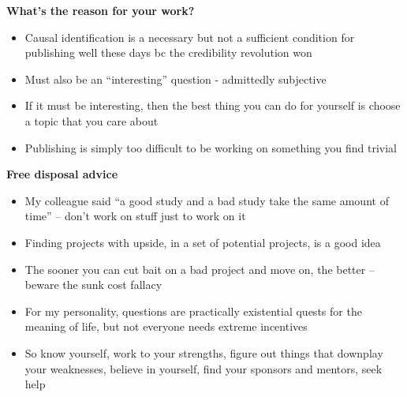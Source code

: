 \documentclass[notes=show]{beamer}
\begin{document}
\begin{frame}[plain]
\begin{center}
\textbf{What's the reason for your work?}
\end{center}

\begin{itemize}
\item Causal identification is a necessary but not a sufficient condition for publishing well these days bc the credibility revolution won
\item Must also be an ``interesting'' question - admittedly subjective
\item If it must be interesting, then the best thing you can do for yourself is choose a topic that you care about
\item Publishing is simply too difficult to be working on something you find trivial
\end{itemize}

\end{frame}

\begin{frame}[plain]
\begin{center}
\textbf{Free disposal advice}
\end{center}

\begin{itemize}
\item My colleague said ``a good study and a bad study take the same amount of time'' -- don't work on stuff just to work on it
\item Finding projects with upside, in a set of potential projects, is a good idea
\item The sooner you can cut bait on a bad project and move on, the better -- beware the sunk cost fallacy
\item For my personality, questions are practically existential quests for the meaning of life, but not everyone needs extreme incentives
\item So know yourself, work to your strengths, figure out things that downplay your weaknesses, believe in yourself, find your sponsors and mentors, seek help
\end{itemize}

\end{frame}
\end{document}
